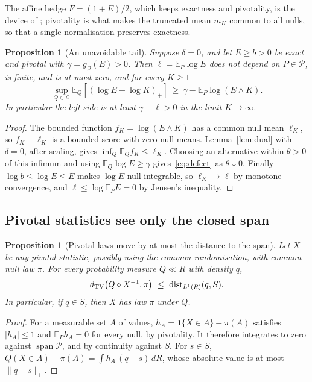 \documentclass[11pt,a4paper]{article}
\newtheorem{proposition}[theorem]{Proposition}
\theoremstyle{definition}
\theoremstyle{remark}
\newcommand{\PP}{\mathcal P}
\newcommand{\QQ}{\mathcal Q}
\newcommand{\EE}{\mathbb E}
\newcommand{\one}{\mathbf 1}
\newcommand{\spn}{\operatorname{span}}
\newcommand{\dist}{\operatorname{dist}}
\begin{document}
The affine hedge \(F=(1+E)/2\), which keeps exactness and pivotality, is the device of \cite[Proposition~6.4]{ZRW}; pivotality is what makes the truncated mean \(m_K\) common to all nulls, so that a single normalisation preserves exactness.

\begin{proposition}[An unavoidable tail]\label{prop:defect}
Suppose \(\delta=0\), and let \(E\ge b>0\) be exact and pivotal with \(\gamma=g_{\QQ}(E)>0\). Then \(\ell=\EE_P\log E\) does not depend on \(P\in\PP\), is finite, and is at most zero, and for every \(K\ge1\)
\begin{equation}\label{eq:defect}
 \sup_{Q\in\QQ}\EE_Q[(\log E-\log K)_+]\ \ge\ \gamma-\EE_P\log(E\wedge K).
\end{equation}
In particular the left side is at least \(\gamma-\ell>0\) in the limit \(K\to\infty\).
\end{proposition}
\begin{proof}
The bounded function \(f_K=\log(E\wedge K)\) has a common null mean \(\ell_K\), so \(f_K-\ell_K\) is a bounded score with zero null means. Lemma~\ref{lem:dual} with \(\delta=0\), after scaling, gives \(\inf_Q\EE_Qf_K\le\ell_K\). Choosing an alternative within \(\theta>0\) of this infimum and using \(\EE_Q\log E\ge\gamma\) gives~\eqref{eq:defect} as \(\theta\downarrow0\). Finally \(\log b\le\log E\le E\) makes \(\log E\) null-integrable, so \(\ell_K\to\ell\) by monotone convergence, and \(\ell\le\log\EE_PE=0\) by Jensen's inequality.
\end{proof}

\subsection{Pivotal statistics see only the closed span}

\begin{proposition}[Pivotal laws move by at most the distance to the span]\label{prop:tv}
Let \(X\) be any pivotal statistic, possibly using the common randomisation, with common null law \(\pi\). For every probability measure \(Q\ll R\) with density \(q\),
\[
 d_{\rm TV}\bigl(Q\circ X^{-1},\pi\bigr)\ \le\ \dist_{L^1(R)}(q,S).
\]
In particular, if \(q\in S\), then \(X\) has law \(\pi\) under \(Q\).
\end{proposition}
\begin{proof}
For a measurable set \(A\) of values, \(h_A=\one\{X\in A\}-\pi(A)\) satisfies \(|h_A|\le1\) and \(\EE_Ph_A=0\) for every null, by pivotality. It therefore integrates to zero against \(\spn\PP\), and by continuity against \(S\). For \(s\in S\),
\(Q(X\in A)-\pi(A)=\int h_A\,(q-s)\,dR\), whose absolute value is at most \(\|q-s\|_1\).
\end{proof}
\end{document}
